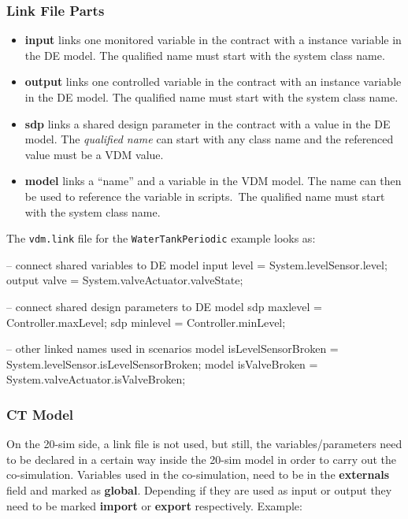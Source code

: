 \documentclass{crescendorepchap}
\newcommand{\vdmkeyw}[1]{{\bf\ttfamily #1}}
\begin{document}
\subsubsection{Link File Parts}

\begin{itemize}
\item
  \vdmkeyw{input} links one monitored variable in the contract with a
  instance variable in the DE model. The qualified name must start with
  the system class name.
\item
  \vdmkeyw{output} links one controlled variable in the contract with
  an instance variable in the DE model. The qualified name must start
  with the system class name.
\item
  \vdmkeyw{sdp} links a shared design parameter in the contract with
  a value in the DE model. The \emph{qualified name} can start with any
  class name and the referenced value must be a VDM value.
\item
  \vdmkeyw{model} links a ``name'' and a variable in the VDM model. The
  name can then be used to reference the variable in scripts.~The
  qualified name must start with the system class name.
\end{itemize}

\noindent The \texttt{vdm.link} file for the \texttt{WaterTankPeriodic} example looks as:

\begin{dcl}
-- connect shared variables to DE model
input level = System.levelSensor.level; 
output valve = System.valveActuator.valveState;

-- connect shared design parameters to DE model
sdp maxlevel = Controller.maxLevel;
sdp minlevel = Controller.minLevel;
	
-- other linked names used in scenarios
model isLevelSensorBroken =
   System.levelSensor.isLevelSensorBroken;
model isValveBroken = 
   System.valveActuator.isValveBroken;
\end{dcl}

\subsubsection{CT Model}

On the 20-sim side, a link file is not used, but still, the
variables/parameters need to be declared in a certain way inside the 20-sim model in order to
carry out the co-simulation.
Variables used in the co-simulation, need to be in the
\vdmkeyw{externals} field and marked as \vdmkeyw{global}. Depending if
they are used as input or output they need to be marked
\vdmkeyw{import} or \vdmkeyw{export} respectively.
Example:
\end{document}
